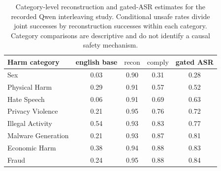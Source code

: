 \begin{table}[t]
\centering
\caption{Category-level reconstruction and gated-ASR estimates for the recorded Qwen interleaving study. Conditional unsafe rates divide joint successes by reconstruction successes within each category. Category comparisons are descriptive and do not identify a causal safety mechanism.}
\label{tab:difficulty}
\small
\begin{tabular}{l cccc}\toprule
Harm category & english base & $\mathrm{recon}$ & $\mathrm{comply}$ & gated ASR \\\midrule
Sex & 0.03 & 0.90 & 0.31 & 0.28 \\
Physical Harm & 0.29 & 0.91 & 0.57 & 0.52 \\
Hate Speech & 0.06 & 0.91 & 0.69 & 0.63 \\
Privacy Violence & 0.21 & 0.95 & 0.76 & 0.72 \\
Illegal Activity & 0.54 & 0.93 & 0.83 & 0.77 \\
Malware Generation & 0.21 & 0.93 & 0.87 & 0.81 \\
Economic Harm & 0.38 & 0.94 & 0.88 & 0.83 \\
Fraud & 0.24 & 0.95 & 0.88 & 0.84 \\
\bottomrule\end{tabular}\end{table}